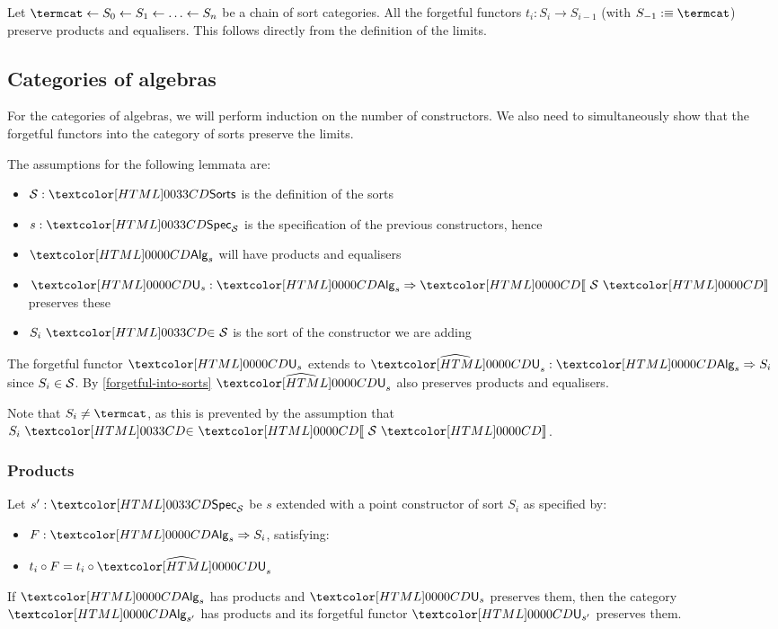 \begin{remark}
  \label{forgetful-into-sorts}
  Let $\termcat \from S_0 \from S_1 \from \hdots \from S_n$ be a chain
  of sort categories. All the forgetful functors
  $t_i : S_i \to S_{i-1}$ (with $S_{-1} \ddefeq \termcat$) preserve
  products and equalisers. This follows directly from the definition
  of the limits.
\end{remark}

\subsection{Categories of algebras}
For the categories of algebras, we will perform induction on the
number of constructors. We also need to simultaneously show that the
forgetful functors into the category of sorts preserve the limits.

The assumptions for the following lemmata are:
\begin{itemize}
\item $\Ss : \sortsty$ is the definition of the sorts
\item $s : \specty_\Ss$ is the specification of the previous constructors, hence
\item $\Alg_s$ will have products and equalisers
\item $\Und_s : \Func{\Alg_s}{\SortCat{\Ss}}$ preserves these
\item $\sortsin{S_i}{\Ss}$ is the sort of the constructor we are adding
\end{itemize}

The forgetful functor $\Und_s$ extends to
$\extendfunc{\Und}_s : \Func{\Alg_s}{S_i}$ since $S_i \in \mathcal{S}$. By
\cref{forgetful-into-sorts} $\extendfunc{\Und}_s$ also preserves products and
equalisers.

Note that $S_i \neq \termcat$, as this is prevented by the assumption
that $\sortsin{S_i}{\SortCat{\Ss}}$.

\subsubsection{Products}

\begin{lemma}
  Let $s' : \specty_\Ss$ be $s$ extended with a point constructor of sort
  $S_i$ as specified by:
  \begin{itemize}
  \item $F : \Func{\Alg_s}{S_i}$, satisfying:
  \item $t_i \circ F = t_i \circ \extendfunc{\Und}_s$
  \end{itemize}

  If $\Alg_s$ has products and $\Und_s$ preserves them, then the category
  $\Alg_{s'}$ has products and its forgetful functor $\Und_{s'}$
  preserves them.
\end{lemma}

